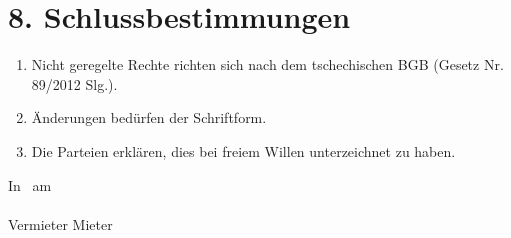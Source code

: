 \section*{8. Schlussbestimmungen}
\begin{enumerate}[label=\arabic*.]
\item Nicht geregelte Rechte richten sich nach dem tschechischen BGB (Gesetz Nr. 89/2012 Slg.).
\item Änderungen bedürfen der Schriftform.
\item Die Parteien erklären, dies bei freiem Willen unterzeichnet zu haben.
\end{enumerate}
\vspace{2cm}
In \ContractPlace \ am \ContractDate \hfill \underline{\hspace{5cm}} \\ \vspace{1.5cm}
\underline{\hspace{5cm}} \hfill \underline{\hspace{5cm}} \\ \vspace{0.2cm} Vermieter \hfill Mieter \\
